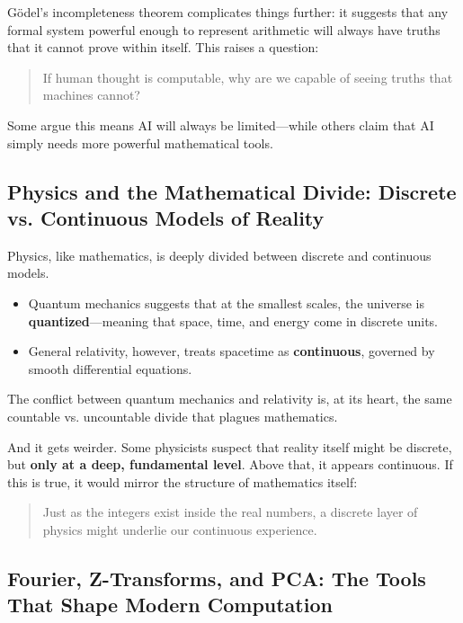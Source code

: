 Gödel’s incompleteness theorem complicates things further: it suggests that any formal system powerful enough to represent arithmetic will always have truths that it cannot prove within itself. This raises a question:

\begin{quote}
If human thought is computable, why are we capable of seeing truths that machines cannot?
\end{quote}

Some argue this means AI will always be limited—while others claim that AI simply needs more powerful mathematical tools.

\subsection{Physics and the Mathematical Divide: Discrete vs. Continuous Models of Reality}

Physics, like mathematics, is deeply divided between discrete and continuous models.

\begin{itemize}
    \item Quantum mechanics suggests that at the smallest scales, the universe is \textbf{quantized}—meaning that space, time, and energy come in discrete units.
    \item General relativity, however, treats spacetime as \textbf{continuous}, governed by smooth differential equations.
\end{itemize}

The conflict between quantum mechanics and relativity is, at its heart, the same countable vs. uncountable divide that plagues mathematics.

And it gets weirder. Some physicists suspect that reality itself might be discrete, but \textbf{only at a deep, fundamental level}. Above that, it appears continuous. If this is true, it would mirror the structure of mathematics itself: 

\begin{quote}
Just as the integers exist inside the real numbers, a discrete layer of physics might underlie our continuous experience.
\end{quote}

\subsection{Fourier, Z-Transforms, and PCA: The Tools That Shape Modern Computation}

